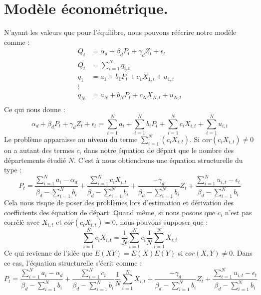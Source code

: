 \documentclass[11pt, a4paper]{article}
\begin{document}
\section*{Modèle économétrique.}
N'ayant les valeurs que pour l'équilibre, nous pouvons réécrire notre modèle comme :
\begin{align*}
  Q_t & = \alpha_d + \beta_d P_t + \gamma_d Z_t + \epsilon_t \\
  Q_t & = \sum_{i = 1}^{N} q_{i,t} \\
  q_1 & = a_1 + b_1 P_{t} + c_1 X_{1,t} + u_{1,t}\\ 
  \vdots \\ 
  q_N & = a_N + b_N P_{t} + c_N X_{N,t} + u_{N,t}\\
\end{align*}
Ce qui nous donne : 
\begin{equation}
    \alpha_d + \beta_d P_t + \gamma_d Z_t + \epsilon_t = 
        \sum_{i = 1}^{N} a_i + \sum_{i = 1}^{N} b_i P_t + \sum_{i = 1}^{N} c_i X_{i,t} + \sum_{i = 1}^{N} u_{i,t}
\end{equation}
Le problème apparaisse au niveau du terme $\sum_{i = 1}^{N} (c_i X_{i,t})$. Si $cor(c_i X_{i,t}) \neq 0$ on a autant des termes $c_i$ dans notre équation de départ que le nombre des départements étudié $N$. 
C'est à nous obtiendrons une équation structurelle du type :
\begin{equation}
    P_t = \frac{\sum_{i = 1}^{N} a_i - \alpha_d}{\beta_d - \sum_{i = 1}^{N} b_i} + 
        \frac{\sum_{i = 1}^{N} c_i  X_{i,t}}{\beta_d - \sum_{i = 1}^{N} b_i} +
        \frac{-\gamma_d}{\beta_d - \sum_{i = 1}^{N} b_i} Z_t + 
        \frac{\sum_{i = 1}^{N} u_{i,t} - \epsilon_t}{\beta_d - \sum_{i = 1}^{N} b_i}
\end{equation}
Cela nous risque de poser des problèmes lors d'estimation et dérivation des coefficients des équation de départ.
Quand même, si nous posons que $c_i$ n'est pas corrélé avec $X_{i,t}$ et $cor(c_i X_{i,t}) = 0$, nous pouvons supposer que :
\begin{equation}
    \sum_{i = 1}^{N} c_i  X_{i,t} = \frac{1}{N} \sum_{i = 1}^{N} c_i \frac{1}{N} \sum_{i = 1}^{N} X_{i,t}
\end{equation}
Ce qui revienne de l'idée que $E(XY) = E(X)E(Y)$ si $cor(X,Y) \neq 0$.
Dans ce cas, l'équation structurelle s'écrit comme :
\begin{equation}
  P_t = \frac{\sum_{i = 1}^{N} a_i - \alpha_d}{\beta_d - \sum_{i = 1}^{N} b_i} + 
      \frac{\sum_{i = 1}^{N} c_i}{\beta_d - \sum_{i = 1}^{N} b_i} \frac{1}{N} \sum_{i = 1}^{N} X_{i,t} +
      \frac{-\gamma_d}{\beta_d - \sum_{i = 1}^{N} b_i} Z_t + 
      \frac{\sum_{i = 1}^{N} u_{i,t} - \epsilon_t}{\beta_d - \sum_{i = 1}^{N} b_i}
\end{equation}
\end{document}

